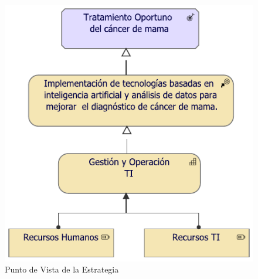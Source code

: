 \begin{figure}[h!]
	\centering
	\includegraphics[width=0.75\linewidth]{ARQUITECTURA/imgs/CapaEstrategica/1_PvEstrategia}
	\caption{Punto de Vista de la Estrategia}
	\label{PvEstretegia}
\end{figure}

